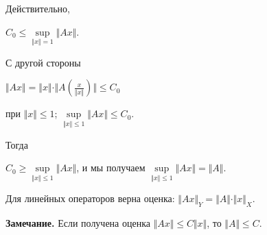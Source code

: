 \documentclass[12pt,a4paper,titlepage,oneside]{book}
\theoremstyle{definition}
\theoremstyle{plain}
\theoremstyle{remark}
\theoremstyle{remark}
\theoremstyle{remark}
\theoremstyle{remark}
\theoremstyle{plain}
\theoremstyle{plain}
\begin{document}
Действительно,
\begin{center}
$C_0\leq 
\underset{\Vert x\Vert=1}{\sup}\Vert Ax \Vert$.
\end{center}

С другой стороны 
\begin{center}
$\Vert Ax \Vert=
\Vert x \Vert \cdot \Vert A(\frac{x}{\Vert x \Vert}) \Vert \leqslant C_0$
\end{center} 
при $\Vert x \Vert \leqslant 1$; 
$\underset{\Vert x\Vert \leqslant 1}{\sup}\Vert Ax \Vert \leqslant C_0$.

Тогда 
\begin{center}
$ C_0 \geqslant\underset{\Vert x\Vert \leqslant 1}{\sup}\Vert Ax \Vert $, и мы получаем 
$\underset{\Vert x\Vert \leqslant 1}{\sup}\Vert Ax \Vert =\Vert A \Vert$.
\end{center}

Для линейных операторов верна оценка: $\Vert Ax \Vert _{Y} =\Vert A \Vert \cdot \Vert x \Vert_{X} $.

\textbf{Замечание.} Если получена оценка  $\Vert Ax \Vert \leqslant {C}  \Vert x \Vert$, то $\Vert A \Vert \leqslant {C} $.
\end{document}
